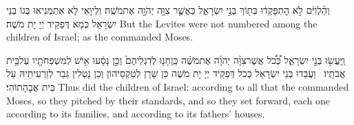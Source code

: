 {וְהַ֨לְוִיִּ֔ם לֹ֣א הׇתְפָּקְד֔וּ בְּת֖וֹךְ בְּנֵ֣י יִשְׂרָאֵ֑ל כַּאֲשֶׁ֛ר צִוָּ֥ה יְהֹוָ֖ה אֶת\maqqaf מֹשֶֽׁה׃}
{וְלֵיוָאֵי לָא אִתְמְנִיאוּ בְּגוֹ בְנֵי יִשְׂרָאֵל כְּמָא דְּפַקֵּיד יְיָ יָת מֹשֶׁה׃}
{But the Levites were not numbered among the children of Israel; as the \lord\space commanded Moses.}{}

{וַֽיַּעֲשׂ֖וּ בְּנֵ֣י יִשְׂרָאֵ֑ל כְּ֠כֹ֠ל אֲשֶׁר\maqqaf צִוָּ֨ה יְהֹוָ֜ה אֶת\maqqaf מֹשֶׁ֗ה כֵּֽן\maqqaf חָנ֤וּ לְדִגְלֵיהֶם֙ וְכֵ֣ן נָסָ֔עוּ אִ֥ישׁ לְמִשְׁפְּחֹתָ֖יו עַל\maqqaf בֵּ֥ית אֲבֹתָֽיו׃ \petucha }
{וַעֲבַדוּ בְּנֵי יִשְׂרָאֵל כְּכֹל דְּפַקֵּיד יְיָ יָת מֹשֶׁה כֵּן שָׁרַן לְטִקְסֵיהוֹן וְכֵן נָטְלִין גְּבַר לְזַרְעִיתֵיהּ עַל בֵּית אֲבָהָתוֹהִי׃}
{Thus did the children of Israel: according to all that the \lord\space commanded Moses, so they pitched by their standards, and so they set forward, each one according to its families, and according to its fathers’ houses.}{}


